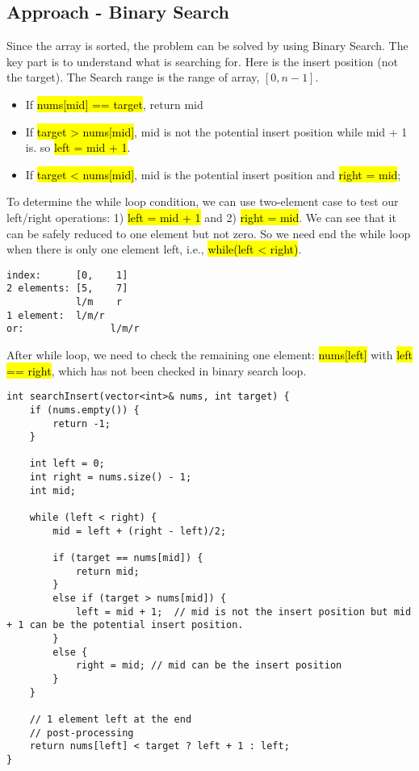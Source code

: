 \documentclass[justified]{tufte-book}
\begin{document}
\subsection{Approach - Binary Search}
Since the array is sorted, the problem can be solved by using Binary Search. The key part is to understand what is searching for. Here is the insert position (not the target).  The Search range is the range of array, $[0, n-1]$. 
\begin{itemize}
    \item If \hl{nums[mid] == target}, return mid
    \item If \hl{target > nums[mid]}, mid is not the potential insert position while mid + 1 is.  so \hl{left = mid + 1}.
    \item If \hl{target < nums[mid]}, mid is the potential insert position and \hl{right = mid};
\end{itemize}
To determine the while loop condition, we can use two-element case to test our left/right operations: 1) \hl{left = mid + 1} and 2) \hl{right = mid}. We can see that it can be safely reduced to one element but not zero. So we need end the while loop when there is only one element left, i.e., \hl{while(left < right)}. 
\begin{lstlisting}
index:      [0,    1]
2 elements: [5,    7]
            l/m    r
1 element:  l/m/r        
or:               l/m/r            
\end{lstlisting}
After while loop, we need to check the remaining one element: \hl{nums[left]} with \hl{left == right}, which has not been checked in binary search loop. 
\begin{lstlisting}
int searchInsert(vector<int>& nums, int target) {
    if (nums.empty()) {
        return -1;
    }
    
    int left = 0;
    int right = nums.size() - 1;
    int mid;
    
    while (left < right) {
        mid = left + (right - left)/2;
        
        if (target == nums[mid]) {
            return mid;
        }
        else if (target > nums[mid]) {
            left = mid + 1;  // mid is not the insert position but mid + 1 can be the potential insert position.
        }
        else {
            right = mid; // mid can be the insert position
        }
    }
    
    // 1 element left at the end
    // post-processing
    return nums[left] < target ? left + 1 : left;
}
\end{lstlisting}
\end{document}
